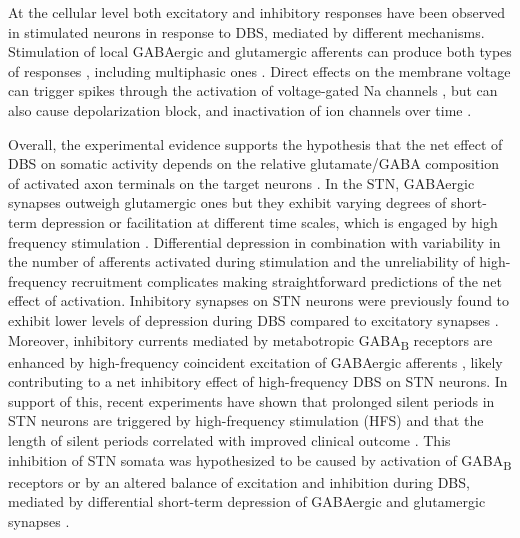 %
%
%
%
%
%
%
%
%

%
At the cellular level both excitatory and inhibitory responses have been
observed in stimulated neurons in response to DBS, mediated by different
mechanisms. Stimulation of local GABAergic and glutamergic afferents can
produce both types of responses \cite{lee_neurotransmitter_2004,anderson_mechanisms_2004},
including multiphasic ones \cite{bar-gad_complex_2004,erez_short-term_2009,mccairn_deep_2009,kita_cortical_2011}.
Direct effects on the membrane voltage can trigger spikes through the activation of
voltage-gated Na channels \cite{mcintyre_deep_2016}, but can also cause depolarization block,
and inactivation of ion channels over time \cite{beurrier_high-frequency_2001,do_sodium_2004,shin_high_2007}.
%

Overall, the experimental evidence supports the hypothesis that the net effect of DBS
on somatic activity depends on the relative glutamate/GABA composition of activated
axon terminals on the target neurons \cite{chiken_mechanism_2016}.
In the STN, GABAergic synapses outweigh glutamergic ones \cite{parent_functional_1995-1}
but they exhibit varying degrees of short-term depression or facilitation at different
time scales, which is engaged by high frequency stimulation \cite{atherton_short-term_2013,froux_d5_2018,steiner_connectivity_2019,milosevic_neuronal_2018}.
Differential depression in combination with variability in the number
of afferents activated during stimulation and the unreliability of high-frequency
recruitment \cite{zheng_axonal_2011,rosenbaum_axonal_2014} complicates making
straightforward predictions of the net effect of activation.
%
%
Inhibitory synapses on STN neurons were previously found to exhibit lower levels
of depression during DBS compared to excitatory synapses \cite{steiner_connectivity_2019}.
Moreover, inhibitory currents mediated by metabotropic GABA\textsubscript{B}
receptors are enhanced by high-frequency coincident excitation of GABAergic
afferents \cite{bevan_cellular_2006}, likely contributing to a net inhibitory
effect of high-frequency DBS on STN neurons.
In support of this, recent experiments have shown that prolonged silent periods
in STN neurons are triggered by high-frequency stimulation (HFS)
and that the length of silent periods correlated
with improved clinical outcome \cite{milosevic_neuronal_2018}. This inhibition
of STN somata was hypothesized to be caused by activation of GABA\textsubscript{B}
receptors \cite{milosevic_neuronal_2018} or by an altered balance of
excitation and inhibition during DBS, mediated by differential short-term depression
of GABAergic and glutamergic synapses \cite{steiner_connectivity_2019}.
%

